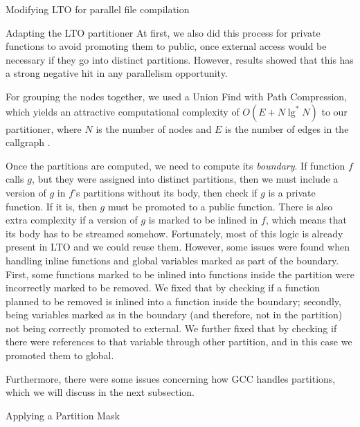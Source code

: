 \begin{section}{Modifying LTO for parallel file compilation}
\begin{subsection}{Adapting the LTO partitioner}
At first, we also did this process for private functions to avoid
promoting them to public, once external access would be necessary if they go
into distinct partitions. However, results showed that this has a strong
negative hit in any parallelism opportunity.

For grouping the nodes together,
we used a Union Find with Path Compression, which yields an attractive
computational complexity of $O(E + N \lg^*N)$ to our partitioner, where $N$ is the
number of nodes and $E$ is the number of edges in the callgraph \citep{feufiloff}.

Once the partitions are computed, we need to compute its \textit{boundary}.
If function $f$ calls $g$, but they were assigned into distinct partitions,
then we must include a version of $g$ in $f$'s partitions without its body,
then check if $g$ is a private function. If it is, then $g$ must be promoted
to a public function. There is also extra complexity if a version of $g$
is marked to be inlined in $f$, which means that its body has to be
streamed somehow. Fortunately, most of this logic is already present
in LTO and we could reuse them. However, some issues were found
when handling inline functions and global variables marked as part
of the boundary. First, some functions marked to be inlined into 
functions inside the partition were incorrectly marked to be removed.
We fixed that by checking if a function planned to be removed is inlined
into a function inside the boundary; secondly, being variables marked as in the boundary (and therefore,
not in the partition) not being correctly promoted to external.
We further fixed that by checking if there were references to that variable
through other partition, and in this case we promoted them to global.

Furthermore, there were some issues concerning how GCC handles
partitions, which we will discuss in the next subsection.

\end{subsection}

\begin{subsection}{Applying a Partition Mask}\label{sec:partition_mask}


\end{subsection}
\end{section}
